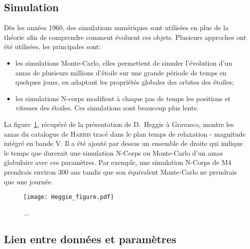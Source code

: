		\subsection{Simulation}
			Dès les années 1960, des simulations numériques sont utilisées en plus de la
			théorie afin de comprendre comment évoluent ces objets.
			Plusieurs approches ont été utilisées, les principales sont:
			\begin{itemize}
					\item les simulations Monte-Carlo, elles permettent de
						simuler l'évolution d'un amas de plusieurs millions
						d'étoile sur une grande période de temps en quelques
						jours, en adaptant les propriétés globales des
						orbites des étoiles;
					\item les simulations N-corps modifient à chaque pas de
						temps les positions et vitesses des étoiles. Ces simulations sont beaucoup plus lente.
			\end{itemize}
			La figure~\ref{Fig::Intro::HeggieFigure}, récupéré de la présentation de
			D.~Heggie à Gravasco, montre les amas du catalogue de
			\textsc{Harris} tracé dans le plan temps de relaxation - magnitude intégré
			en bande V. Il a été ajouté par dessus un ensemble de droite qui indique le
			temps que durerait une simulation N-Corps ou Monte-Carlo d'un amas
			globulaire avec ces paramètres. Par exemple, une simulation N-Corps de M4
			prendrais environ 300 ans tandis que son équivalent Monte-Carlo ne prendrais
			que une journée.

			\begin{figure}
				\centering \texttt{[image: Heggie\_figure.pdf]}
				\caption{\label{Fig::Intro::HeggieFigure}...}
			\end{figure}

		\subsection[Lien]{Lien entre données et paramètres\label{amas}}
